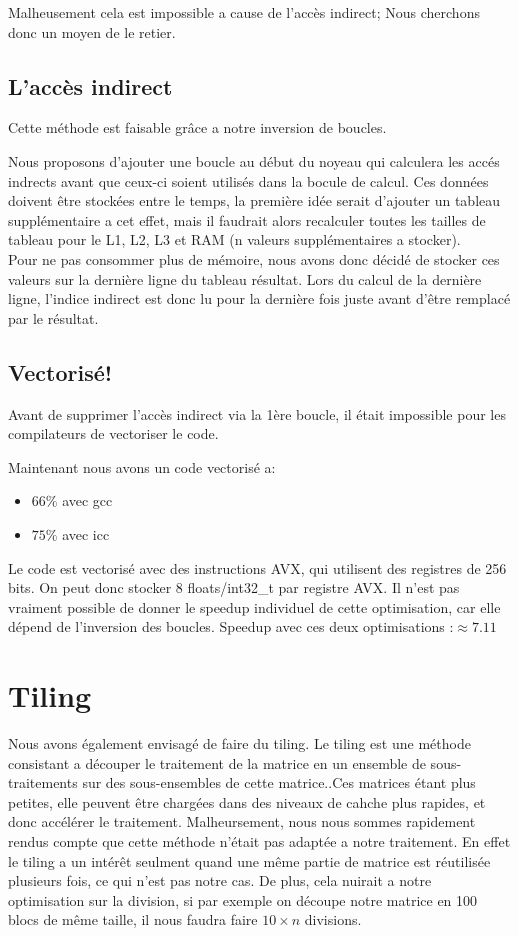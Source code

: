 Malheusement cela est impossible a cause de l'accès indirect; Nous cherchons donc un moyen de le retier.
\subsection*{L'accès indirect}
Cette méthode est faisable grâce a notre inversion de boucles.

Nous proposons d'ajouter une boucle au début du noyeau qui calculera les accés indrects avant que ceux-ci soient utilisés dans la bocule de calcul.
Ces données doivent être stockées entre le temps, la première idée serait d'ajouter un tableau supplémentaire a cet effet, mais il faudrait alors recalculer toutes les tailles de tableau pour le L1, L2, L3 et RAM (n valeurs supplémentaires a stocker).\\

Pour ne pas consommer plus de mémoire, nous avons donc décidé de stocker ces valeurs sur la dernière ligne du tableau résultat.
Lors du calcul de la dernière ligne, l'indice indirect est donc lu pour la dernière fois juste avant d'être remplacé par le résultat. 

\subsection*{Vectorisé!}
Avant de supprimer l'accès indirect via la 1ère boucle, il était impossible pour les compilateurs de vectoriser le code.

Maintenant nous avons un code vectorisé a:
    \begin{itemize}
    \item{$66\%$ avec gcc}
    \item{$75\%$ avec icc}
    \end{itemize}

    Le code est vectorisé avec des instructions AVX, qui utilisent des registres de 256 bits. On peut donc stocker 8 floats/int32\_t par registre AVX.
    Il n'est pas vraiment possible de donner le speedup individuel de cette optimisation, car elle dépend de l'inversion des boucles.
Speedup avec ces deux optimisations :$\approx 7.11$
\section*{Tiling}
Nous avons également envisagé de faire du tiling. Le tiling est une méthode consistant a découper le traitement de la matrice en un ensemble de sous-traitements sur des sous-ensembles de cette matrice..Ces matrices étant plus petites, elle peuvent être chargées dans des niveaux de cahche plus rapides, et donc accélérer le traitement.
Malheursement, nous nous sommes rapidement rendus compte que cette méthode n'était pas adaptée a notre traitement.
En effet le tiling a un intérêt seulment quand une même partie de matrice est réutilisée plusieurs fois, ce qui n'est pas notre cas.
De plus, cela nuirait a notre optimisation sur la division, si par exemple on découpe notre matrice en 100 blocs de même taille, il nous faudra faire $10\times n $ divisions.

